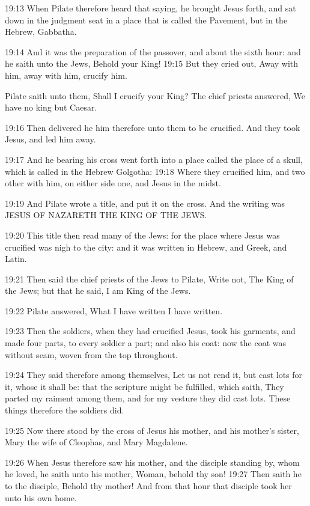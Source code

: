 19:13 When Pilate therefore heard that saying, he brought Jesus forth, and sat down in the judgment seat in a place that is called the Pavement, but in the Hebrew, Gabbatha.

19:14 And it was the preparation of the passover, and about the sixth hour: and he saith unto the Jews, Behold your King!  19:15 But they cried out, Away with him, away with him, crucify him.

Pilate saith unto them, Shall I crucify your King? The chief priests answered, We have no king but Caesar.

19:16 Then delivered he him therefore unto them to be crucified. And they took Jesus, and led him away.

19:17 And he bearing his cross went forth into a place called the place of a skull, which is called in the Hebrew Golgotha: 19:18 Where they crucified him, and two other with him, on either side one, and Jesus in the midst.

19:19 And Pilate wrote a title, and put it on the cross. And the writing was JESUS OF NAZARETH THE KING OF THE JEWS.

19:20 This title then read many of the Jews: for the place where Jesus was crucified was nigh to the city: and it was written in Hebrew, and Greek, and Latin.

19:21 Then said the chief priests of the Jews to Pilate, Write not, The King of the Jews; but that he said, I am King of the Jews.

19:22 Pilate answered, What I have written I have written.

19:23 Then the soldiers, when they had crucified Jesus, took his garments, and made four parts, to every soldier a part; and also his coat: now the coat was without seam, woven from the top throughout.

19:24 They said therefore among themselves, Let us not rend it, but cast lots for it, whose it shall be: that the scripture might be fulfilled, which saith, They parted my raiment among them, and for my vesture they did cast lots. These things therefore the soldiers did.

19:25 Now there stood by the cross of Jesus his mother, and his mother's sister, Mary the wife of Cleophas, and Mary Magdalene.

19:26 When Jesus therefore saw his mother, and the disciple standing by, whom he loved, he saith unto his mother, Woman, behold thy son!  19:27 Then saith he to the disciple, Behold thy mother! And from that hour that disciple took her unto his own home.

